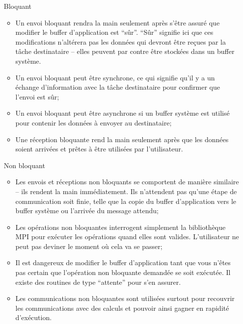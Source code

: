 \documentclass[11pt,a4paper]{article}
\begin{document}
\begin{itemize}
\item[Bloquant]
  \begin{itemize}
  \item Un envoi bloquant rendra la main seulement après s'être assuré que modifier le buffer d'application est ``sûr''.
``Sûr'' signifie ici que ces modifications n'altérera pas les données qui devront être reçues par la tâche destinataire -- elles peuvent
par contre être stockées dans un buffer système.
\item Un envoi bloquant peut être synchrone, ce qui signifie qu'il y a un échange d'information avec la tâche destinataire pour
confirmer que l'envoi est sûr;
\item Un envoi bloquant peut être asynchrone si un buffer système est utilisé pour contenir les données à envoyer au destinataire;
\item Une réception bloquante rend la main seulement après que les données soient arrivées et prêtes à être utilisées par
l'utilisateur.
  \end{itemize}
\item[Non bloquant]
\begin{itemize}
\item Les envois et réceptions non bloquants se comportent de manière similaire -- ils rendent la main immédiatement. Ils n'attendent pas
qu'une étape de communication soit finie, telle que la copie du buffer d'application vers le buffer système ou l'arrivée du message attendu;
\item Les opérations non bloquantes interrogent simplement la bibliothèque MPI pour exécuter les opérations quand elles sont valides. L'utilisateur
ne peut pas deviner le moment où cela va se passer;
\item Il est dangereux de modifier le buffer d'application tant que vous n'êtes pas certain que l'opération non bloquante demandée se soit
exécutée. Il existe des routines de type ``attente'' pour s'en assurer.
\item Les communications non bloquantes sont utilisées surtout pour recouvrir les communications avec des calculs et pouvoir ainsi gagner
en rapidité d'exécution.
\end{itemize}
\end{itemize}
\end{document}
